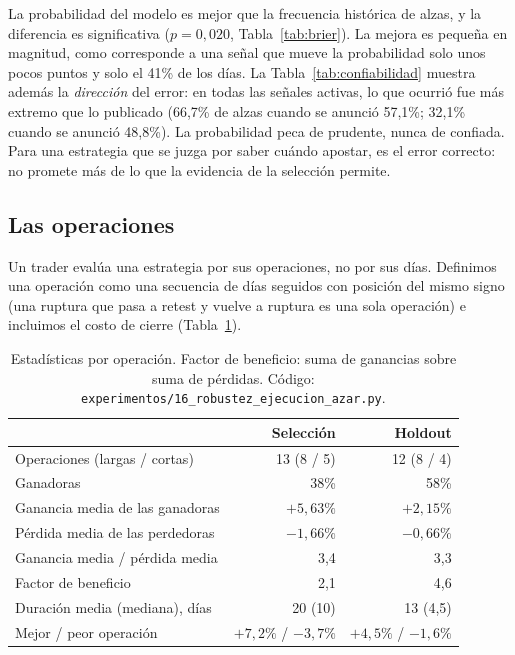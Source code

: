 \documentclass[10pt,a4paper]{article}
\newcommand{\ruta}[1]{\nolinkurl{#1}}
\begin{document}
La probabilidad del modelo es mejor que la frecuencia histórica de alzas, y la diferencia
es significativa ($p=0{,}020$, Tabla~\ref{tab:brier}). La mejora es pequeña en
magnitud, como corresponde a una señal que mueve la probabilidad solo unos pocos puntos
y solo el 41\% de los días. La Tabla~\ref{tab:confiabilidad} muestra además la
\emph{dirección} del error: en todas las señales activas, lo que ocurrió fue más
extremo que lo publicado (66,7\% de alzas cuando se anunció 57,1\%; 32,1\% cuando se
anunció 48,8\%). La probabilidad peca de prudente, nunca de confiada. Para una
estrategia que se juzga por saber cuándo apostar, es el error correcto: no promete más
de lo que la evidencia de la selección permite.

\subsection{Las operaciones}\label{sec:operaciones}

Un trader evalúa una estrategia por sus operaciones, no por sus días. Definimos una
operación como una secuencia de días seguidos con posición del mismo signo (una
ruptura que pasa a retest y vuelve a ruptura es una sola operación) e incluimos el costo
de cierre (Tabla~\ref{tab:operaciones}).

\begin{table}[htb]\centering\small
\begin{tabular}{@{}lrr@{}}
\toprule
& Selección & Holdout \\
\midrule
Operaciones (largas / cortas)      & 13 (8 / 5) & 12 (8 / 4) \\
Ganadoras                          & 38\%       & 58\% \\
Ganancia media de las ganadoras    & $+5{,}63\%$ & $+2{,}15\%$ \\
Pérdida media de las perdedoras    & $-1{,}66\%$ & $-0{,}66\%$ \\
Ganancia media / pérdida media     & 3,4        & 3,3 \\
Factor de beneficio                & 2,1        & 4,6 \\
Duración media (mediana), días     & 20 (10)    & 13 (4,5) \\
Mejor / peor operación             & $+7{,}2\%$ / $-3{,}7\%$ & $+4{,}5\%$ / $-1{,}6\%$ \\
\bottomrule
\end{tabular}
\caption{Estadísticas por operación. Factor de beneficio: suma de ganancias sobre suma
de pérdidas. Código: \ruta{experimentos/16_robustez_ejecucion_azar.py}.}
\label{tab:operaciones}
\end{table}
\end{document}
